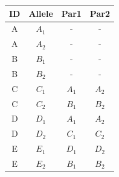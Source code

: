\documentclass[a4paper,11pt]{article}
\begin{document}
\begin{table}[!ht]
\centering
\begin{tabular}{cccc}
\hline
ID & Allele & Par1 & Par2 \\
\hline
A & $A_1$ & - & - \\
A & $A_2$ & - & - \\
B & $B_1$ & - & - \\
B & $B_2$ & - & - \\
C & $C_1$ & $A_1$ & $A_2$ \\
C & $C_2$ & $B_1$ & $B_2$ \\
D & $D_1$ & $A_1$ & $A_2$ \\
D & $D_2$ & $C_1$ & $C_2$ \\
E & $E_1$ & $D_1$ & $D_2$ \\
E & $E_2$ & $B_1$ & $B_2$ \\
\hline
\end{tabular}
\end{table}
\end{document}
